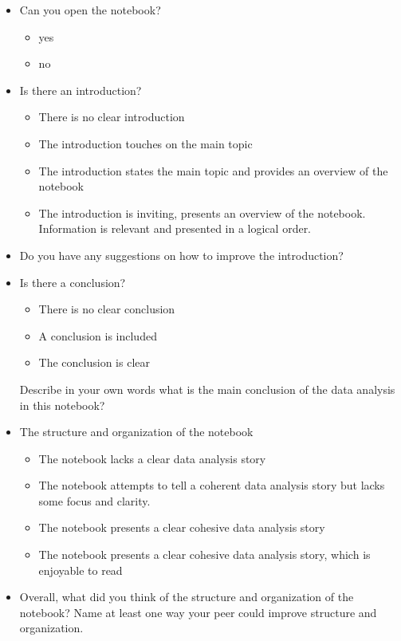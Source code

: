 \documentclass[a4paper,11pt]{article}
\begin{document}
\begin{itemize}
\item Can you open the notebook?
\begin{itemize}
\item yes
\item no
\end{itemize}

\item Is there an introduction? 
  \begin{itemize}
  \item There is no clear introduction
  \item The introduction touches on the main topic
  \item The introduction states the main topic and provides an overview of the notebook
  \item The introduction is inviting, presents an overview of the
    notebook. Information is relevant and presented in a logical
    order.
\end{itemize}

\item Do you have any suggestions on how to improve the introduction?

\item Is there a conclusion? 
  \begin{itemize}
  \item There is no clear conclusion
  \item A conclusion is included
  \item The conclusion is clear
  \end{itemize}
  
Describe in your own words what is the main conclusion of the data analysis in this notebook?

\item The structure and organization of the notebook
  \begin{itemize}
  \item The notebook lacks a clear data analysis story
  \item The notebook attempts to tell a coherent data analysis story but lacks some focus and clarity.
  \item The notebook presents a clear cohesive data analysis story
  \item The notebook presents a clear cohesive data analysis
    story, which is enjoyable to read
  \end{itemize}
  
\item Overall, what did you think of the structure and organization of the
notebook? Name at least one way your peer could improve structure and
organization.


\end{itemize}
\end{document}
